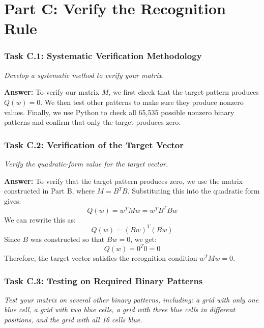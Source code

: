 \documentclass[11pt]{article}
\begin{document}
\newpage

\section*{Part C: Verify the Recognition Rule}

\subsubsection*{Task C.1: Systematic Verification Methodology}
\textit{Develop a systematic method to verify your matrix.}

\vspace{0.4em}
\textbf{Answer:} To verify our matrix \(M\), we first check that the target pattern produces \(Q(w)=0\). We then test other patterns to make sure they produce nonzero values. Finally, we use Python to check all 65,535 possible nonzero binary patterns and confirm that only the target produces zero.

\vspace{0.5em}

\subsubsection*{Task C.2: Verification of the Target Vector}
\textit{Verify the quadratic-form value for the target vector.}

\vspace{0.4em}
\textbf{Answer:} To verify that the target pattern produces zero, we use the matrix constructed in Part B, where \(M=B^TB\).
Substituting this into the quadratic form gives:
\[
Q(w)=w^TMw=w^TB^TBw
\]
We can rewrite this as:
\[
Q(w)=(Bw)^T(Bw)
\]
Since \(B\) was constructed so that \(Bw=0\), we get:
\[
Q(w)=0^T0=0
\]
Therefore, the target vector satisfies the recognition condition \(w^TMw=0\).

\vspace{0.5em}

\subsubsection*{Task C.3: Testing on Required Binary Patterns}
\textit{Test your matrix on several other binary patterns, including: a grid with only one blue cell, a grid with two blue cells, a grid with three blue cells in different positions, and the grid with all 16 cells blue.}
\end{document}
